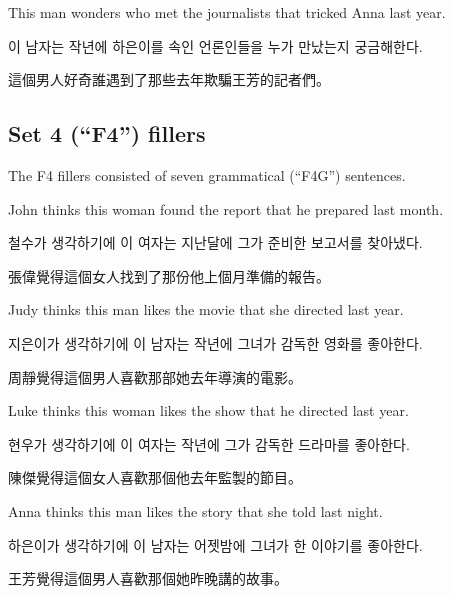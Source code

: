 \pex %
\a[label=E] This man wonders who met the journalists that tricked Anna last year.\par\nobreak
\a[label=K] \ko 이 남자는 작년에 하은이를 속인 언론인들을 누가 만났는지 궁금해한다\normalfont.\par\nobreak
\a[label=M] \zh 這個男人好奇誰遇到了那些去年欺騙王芳的記者們。\normalfont
\xe

\subsection{Set 4 (``F4'') fillers}

\vspace{.2cm}

The F4 fillers consisted of seven grammatical (``F4G'') sentences.

\vspace{.2cm}

\pex %
\a[label=E] John thinks this woman found the report that he prepared last month.\par\nobreak
\a[label=K] \ko 철수가 생각하기에 이 여자는 지난달에 그가 준비한 보고서를 찾아냈다\normalfont.\par\nobreak
\a[label=M] \zh 張偉覺得這個女人找到了那份他上個月準備的報告。\normalfont
\xe

\pex %
\a[label=E] Judy thinks this man likes the movie that she directed last year.\par\nobreak
\a[label=K] \ko 지은이가 생각하기에 이 남자는 작년에 그녀가 감독한 영화를 좋아한다\normalfont.\par\nobreak
\a[label=M] \zh 周靜覺得這個男人喜歡那部她去年導演的電影。\normalfont
\xe

\pex %
\a[label=E] Luke thinks this woman likes the show that he directed last year.\par\nobreak
\a[label=K] \ko 현우가 생각하기에 이 여자는 작년에 그가 감독한 드라마를 좋아한다\normalfont.\par\nobreak
\a[label=M] \zh 陳傑覺得這個女人喜歡那個他去年監製的節目。\normalfont
\xe

\pex %
\a[label=E] Anna thinks this man likes the story that she told last night.\par\nobreak
\a[label=K] \ko 하은이가 생각하기에 이 남자는 어젯밤에 그녀가 한 이야기를 좋아한다\normalfont.\par\nobreak
\a[label=M] \zh 王芳覺得這個男人喜歡那個她昨晚講的故事。\normalfont
\xe

